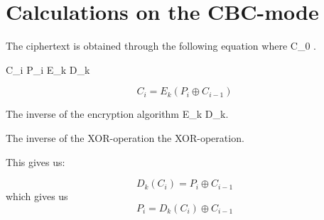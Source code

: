 \section{Calculations on the CBC-mode} \label{sec:CBCcalc}
The ciphertext is obtained through the following equation where \newline
C_{0} \oplus.

C_i  \newline
P_i  \newline
E_k  \newline
D_k  \newline

\begin{equation}
C_{i} = E_{k}(P_{i} \oplus C_{i-1})
\end{equation}

The inverse of the encryption algorithm E_{k}  D_{k}.

The inverse of the XOR-operation the XOR-operation.

This gives us:

\begin{equation}
D_{k}(C_{i}) = P_{i} \oplus C_{i-1}
\end{equation}
which gives us
\begin{equation}
P_{i} = D_{k}(C_{i})\oplus C_{i-1}
\end{equation}
